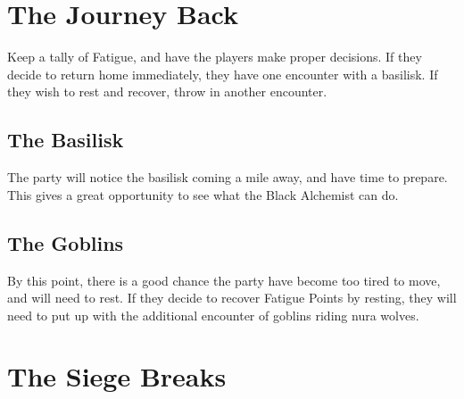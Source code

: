 \section{The Journey Back}
\label{siege}

\begin{multicols}{2}

Keep a tally of Fatigue, and have the players make proper decisions.
If they decide to return home immediately, they have one encounter with a basilisk.
If they wish to rest and recover, throw in another encounter.

\subsection{The Basilisk}

The party will notice the basilisk coming a mile away, and have time to prepare.
This gives a great opportunity to see what the Black Alchemist can do.

\basilisk

\subsection{The Goblins}

By this point, there is a good chance the party have become too tired to move, and will need to rest.
If they decide to recover Fatigue Points by resting, they will need to put up with the additional encounter of goblins riding nura wolves.



\end{multicols}

\section{The Siege Breaks}

